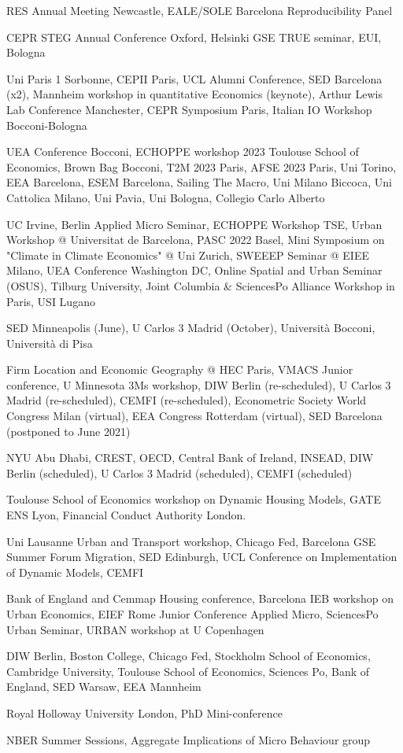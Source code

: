 \documentclass[letterpaper]{article}
\renewenvironment{itemize}{
  \begin{list}{}{
    \setlength{\leftmargin}{1.5em}
  }
}{
  \end{list}
}
\begin{document}
\begin{itemize}
\item[2026:] RES Annual Meeting Newcastle, EALE/SOLE Barcelona Reproducibility Panel
\item[2025:] CEPR STEG Annual Conference Oxford, Helsinki GSE TRUE seminar, EUI, Bologna 
\item[2024:] Uni Paris 1 Sorbonne, CEPII Paris, UCL Alumni Conference, SED Barcelona (x2), Mannheim workshop in quantitative Economics (keynote), Arthur Lewis Lab Conference Manchester, CEPR Symposium Paris, Italian IO Workshop Bocconi-Bologna
\item[2023:] UEA Conference Bocconi, ECHOPPE workshop 2023 Toulouse School of Economics, Brown Bag Bocconi, T2M 2023 Paris, AFSE 2023 Paris, Uni Torino, EEA Barcelona, ESEM Barcelona, Sailing The Macro, Uni Milano Biccoca, Uni Cattolica Milano, Uni Pavia, Uni Bologna, Collegio Carlo Alberto 
\item[2022:] UC Irvine, Berlin Applied Micro Seminar, ECHOPPE Workshop TSE, Urban Workshop @ Universitat de Barcelona, PASC 2022 Basel, Mini Symposium on "Climate in Climate Economics" @ Uni Zurich, SWEEEP Seminar @ EIEE Milano, UEA Conference Washington DC, Online Spatial and Urban Seminar (OSUS), Tilburg University, Joint Columbia \& SciencesPo Alliance Workshop in Paris, USI Lugano    
\item[2021:] SED Minneapolis (June), U Carlos 3 Madrid (October), Università Bocconi, Università di Pisa
\item[2020:] Firm Location and Economic Geography @ HEC Paris, VMACS Junior conference, U Minnesota 3Ms workshop, DIW Berlin (re-scheduled), U Carlos 3 Madrid (re-scheduled), CEMFI (re-scheduled), Econometric Society World Congress Milan (virtual), EEA Congress Rotterdam (virtual), SED Barcelona (postponed to June 2021)
\item[2019:] NYU Abu Dhabi, CREST, OECD, Central Bank of Ireland, INSEAD, DIW Berlin (scheduled), U Carlos 3 Madrid (scheduled), CEMFI (scheduled)
\item[2018:] Toulouse School of Economics workshop on Dynamic Housing Models, GATE ENS Lyon, Financial Conduct Authority London.
\item[2017:] Uni Lausanne Urban and Transport workshop, Chicago Fed, Barcelona GSE Summer Forum Migration, SED Edinburgh, UCL Conference on Implementation of Dynamic Models, CEMFI
\item[2016:] Bank of England and Cemmap Housing conference, Barcelona IEB workshop on Urban Economics, EIEF Rome Junior Conference Applied Micro, SciencesPo Urban Seminar, URBAN workshop at U Copenhagen
\item[2015:] DIW Berlin, Boston College, Chicago Fed, Stockholm School of Economics, Cambridge University, Toulouse School of Economics, Sciences Po, Bank of England, SED Warsaw, EEA Mannheim
\item[2014:] Royal Holloway University London, PhD Mini-conference
\item[2013:] NBER Summer Sessions, Aggregate Implications of Micro Behaviour group
\end{itemize}
\end{document}
